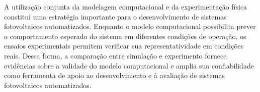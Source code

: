 A utilização conjunta da modelagem computacional e da experimentação física constitui uma estratégia importante para o desenvolvimento de sistemas fotovoltaicos automatizados. Enquanto o modelo computacional possibilita prever o comportamento esperado do sistema em diferentes condições de operação, os ensaios experimentais permitem verificar sua representatividade em condições reais. Dessa forma, a comparação entre simulação e experimento fornece evidências sobre a validade do modelo computacional e amplia sua confiabilidade como ferramenta de apoio ao desenvolvimento e à avaliação de sistemas fotovoltaicos automatizados.
